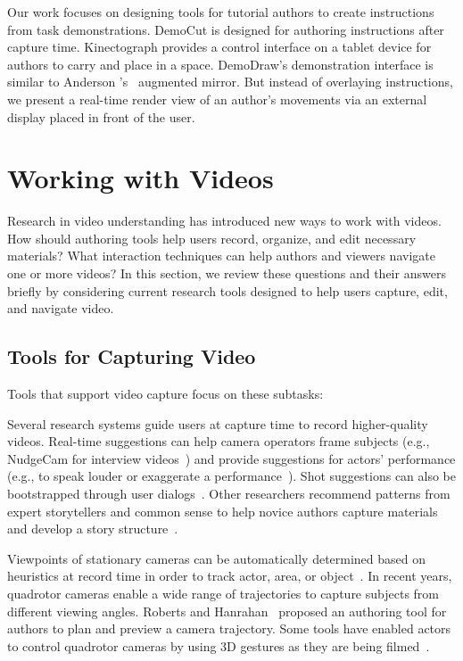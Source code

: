 Our work focuses on designing tools for tutorial authors to create instructions from task demonstrations. DemoCut is designed for authoring instructions after capture time. Kinectograph provides a control interface on a tablet device for authors to carry and place in a space. DemoDraw's demonstration interface is similar to Anderson \ea{}'s~\cite{Anderson:2013:YEM:2501988.2502045} augmented mirror. But instead of overlaying instructions, we present a real-time render view of an author's movements via an external display placed in front of the user.


\section{Working with Videos}
\label{related_videos}

Research in video understanding has introduced new ways to work with videos. How should authoring tools help users record, organize, and edit necessary materials? What interaction techniques can help authors and viewers navigate one or more videos?
In this section, we review these questions and their answers briefly by considering current research tools designed to help users capture, edit, and navigate video.


\subsection{Tools for Capturing Video}
Tools that support video capture focus on these subtasks:

Several research systems guide users at capture time to record higher-quality videos.
Real-time suggestions can help camera operators frame subjects (e.g., NudgeCam for interview videos~\cite{Carter:2010}) and provide suggestions for actors' performance (e.g., to speak louder or exaggerate a performance~\cite{Heer:2004ba,Davis:2003cu}). Shot suggestions can also be bootstrapped through user dialogs~\cite{Adams:2005}.
%
Other researchers recommend patterns from expert storytellers and common sense to help novice authors capture materials and develop a story structure~\cite{Barry:2003:MCC:957013.957152,Kim:2015:MSN:2702123.2702507}.

Viewpoints of stationary cameras can be automatically determined based on heuristics at record time in order to track actor, area, or object~\cite{Ranjan:2008,Okumura:2011tr}.
%
In recent years, quadrotor cameras enable a wide range of trajectories to capture subjects from different viewing angles. Roberts and Hanrahan~\cite{Roberts:2016:GDF:2897824.2925980} proposed an authoring tool for authors to plan and preview a camera trajectory.
Some tools have enabled actors to control quadrotor cameras by using 3D gestures as they are being filmed~\cite{Cauchard:2015:DME:2750858.2805823,Pfeil:2013:EGM:2449396.2449429}.

